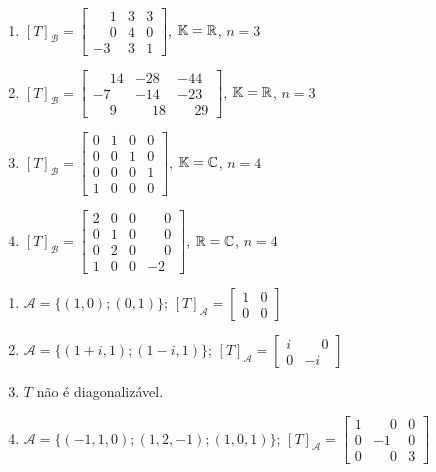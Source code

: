 \documentclass[12pt]{exam}
\begin{document}
\begin{exercicio}
\begin{enumerate}[label=({\alph*})]
    \item $[T]_\mathcal{B} = \begin{bmatrix} \phantom{-} 1 & 3 & 3\\ \phantom{-} 0 & 4 & 0\\ -3 & 3 & 1\end{bmatrix}$, $\mathbb{K} = \mathbb{R}$, $n = 3$
    \item $[T]_\mathcal{B} = \begin{bmatrix} \phantom{-} 14 & -28 & -44\\ -7 & -14 & -23\\ \phantom{-} 9 & \phantom{-} 18 & \phantom{-} 29\end{bmatrix}$, $\mathbb{K} = \mathbb{R}$, $n = 3$
    \item $[T]_\mathcal{B} = \begin{bmatrix} 0 & 1 & 0 & 0\\ 0 & 0 & 1 & 0\\ 0 & 0 & 0 & 1 \\ 1 & 0 & 0 & 0\end{bmatrix}$, $\mathbb{K} = \mathbb{C}$, $n = 4$
    \item $[T]_\mathcal{B} = \begin{bmatrix} 2 & 0 & 0 & \phantom{-}0\\ 0 & 1 & 0 & \phantom{-}0\\ 0 & 2 & 0 & \phantom{-}0 \\ 1 & 0 & 0 & -2\end{bmatrix}$, $\mathbb{R} = \mathbb{C}$, $n = 4$
  \end{enumerate}
  \begin{solucao}
      \begin{enumerate}[label=({\alph*})]
          \item $\mathcal{A} = \{(1,0);(0,1)\}$; $[T]_\mathcal{A} = \begin{bmatrix} 1 & 0\\ 0 & 0\end{bmatrix}$
          \item $\mathcal{A} = \{(1 + i,1);(1 - i,1)\}$; $[T]_\mathcal{A} = \begin{bmatrix} i & \phantom{-} 0\\ 0 & -i\end{bmatrix}$
          \item $T$ não é diagonalizável.
          \item $\mathcal{A} = \{(-1,1,0);(1,2,-1);(1,0,1)\}$; $[T]_\mathcal{A} = \begin{bmatrix} 1 & \phantom{-} 0 & 0\\ 0 & -1 & 0\\0 & \phantom{-} 0 & 3\end{bmatrix}$

\end{enumerate}
\end{solucao}
\end{exercicio}
\end{document}
